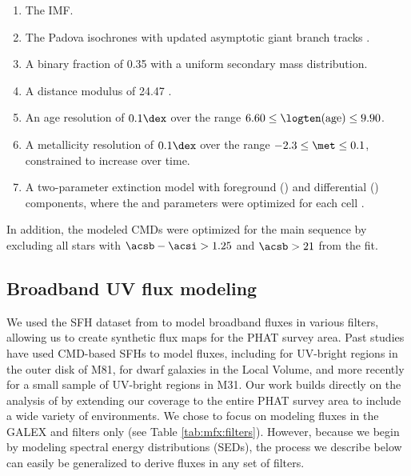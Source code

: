 \begin{enumerate}
\item The \citet{Kroupa:2001} IMF.
\item The Padova isochrones \citep{Marigo:2008} with updated asymptotic giant
    branch tracks \citep{Girardi:2010}.
\item A binary fraction of 0.35 with a uniform secondary mass distribution.
\item A distance modulus of 24.47 \citep{McConnachie:2005}.
\item An age resolution of $0.1\dex$ over the range $6.60 \le
    \logten(\mathrm{age}) \le 9.90$.
\item A metallicity resolution of $0.1\dex$ over the range $-2.3 \le \met \le
    0.1$, constrained to increase over time.
\item A two-parameter extinction model with foreground (\avf{}) and
    differential (\dav{}) components, where the \avf{} and \dav{} parameters
    were optimized for each cell \citep[see also][]{Simones:2014}.
\end{enumerate}

In addition, the modeled CMDs were optimized for the main sequence by excluding
all stars with $\acsb - \acsi > 1.25$ and $\acsb > 21$ from the fit.



\subsection{Broadband UV flux modeling}\label{mfx:syntheticfluxmaps:fluxmod}

We used the SFH dataset from \citet{Lewis:2014} to model broadband fluxes in
various filters, allowing us to create synthetic flux maps for the PHAT survey
area. Past studies have used CMD-based SFHs to model fluxes, including
\citet{Gogarten:2009} for UV-bright regions in the outer disk of M81,
\citet{Johnson:2013} for dwarf galaxies in the Local Volume, and more recently
\citet{Simones:2014} for a small sample of UV-bright regions in M31. Our work
builds directly on the analysis of \citet{Simones:2014} by extending our
coverage to the entire PHAT survey area to include a wide variety of
environments. We chose to focus on modeling fluxes in the GALEX \fuv{} and
\nuv{} filters only (see Table \ref{tab:mfx:filters}). However, because we
begin by modeling spectral energy distributions (SEDs), the process we describe
below can easily be generalized to derive fluxes in any set of filters.

